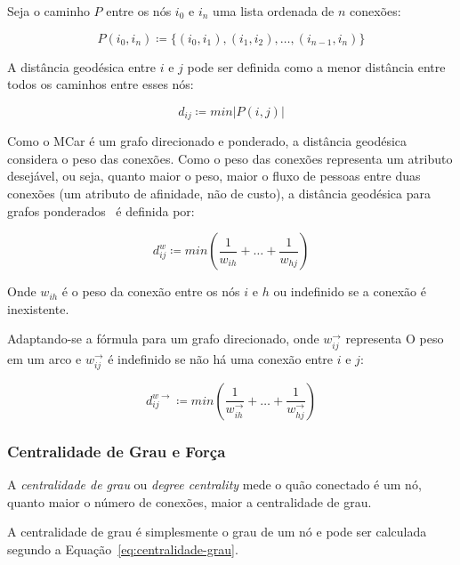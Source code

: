 \documentclass[12pt,a4paper]{article}
\theoremstyle{hypo}
\newcommand{\defn}{\coloneqq} %
\newcommand{\wout}{w^\rightarrow} %
\newcommand{\weighted}[1]{#1^w} %
\newcommand{\weighteddir}[1]{#1^{w\rightarrow}} %
\begin{document}
Seja o caminho $P$ entre os nós $i_0$ e $i_n$ uma lista ordenada de $n$ conexões:

\begin{equation} \label{eq:caminho}
P(i_0,i_n) \defn \{(i_0,i_1), (i_1,i_2), \ldots, (i_{n-1},i_n)\}
\end{equation}

A distância geodésica entre $i$ e $j$ pode ser definida como a menor distância entre todos os caminhos entre esses nós:

\begin{equation} \label{eq:distancia-geodesica}
d_{ij} \defn min|P(i, j)| 
\end{equation}

Como o MCar é um grafo direcionado e ponderado, a distância geodésica considera o peso das conexões. Como o peso das conexões representa um atributo desejável, ou seja, quanto maior o peso, maior o fluxo de pessoas entre duas conexões (um atributo de afinidade, não de custo),  a distância geodésica para grafos ponderados~\cite{Newman2001-sl} é definida por:

\begin{equation} \label{eq:distancia-ponderada}
\weighted{d}_{ij} \defn min\left(\frac{1}{w_{ih}} + \ldots + \frac{1}{w_{hj}}\right)
\end{equation}

Onde $w_{ih}$ é o peso da conexão entre os nós $i$ e $h$ ou indefinido se a conexão é inexistente.

Adaptando-se a fórmula para um grafo direcionado, onde $\wout_{ij}$ representa O peso em um arco e $\wout_{ij}$ é indefinido se não há uma conexão entre $i$ e $j$:

\begin{equation} \label{eq:distancia-ponderada-direcionada}
\weighteddir{d}_{ij} \defn min\left(\frac{1}{\wout_{ih}} + \ldots + \frac{1}{\wout_{hj}}\right)
\end{equation}

\subsubsection{Centralidade de Grau e Força} \label{sec:forca}

A \textit{centralidade de grau} ou \textit{degree centrality} mede o quão conectado é um nó, quanto maior o número de conexões, maior a centralidade de grau.

A centralidade de grau é simplesmente o grau de um nó e pode ser calculada segundo a Equação~\ref{eq:centralidade-grau}.
\end{document}

